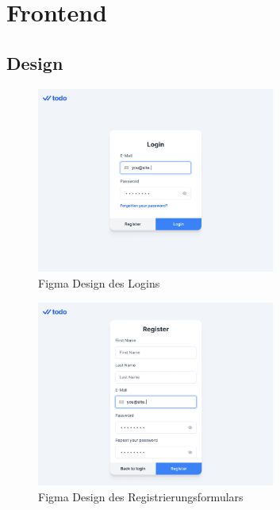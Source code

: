\documentclass[a4paper, 12pt]{article}
\begin{document}
    \section{Frontend}
    \subsection{Design}

    \begin{figure}[H]
        \center\includegraphics[width=0.7\textwidth]{../images/figma/login}
        \caption{Figma Design des Logins}\label{fig:figure}
    \end{figure}

    \begin{figure}[H]
        \center\includegraphics[width=0.7\textwidth]{../images/figma/register}
        \caption{Figma Design des Registrierungsformulars}\label{fig:figure}
    \end{figure}
\end{document}
